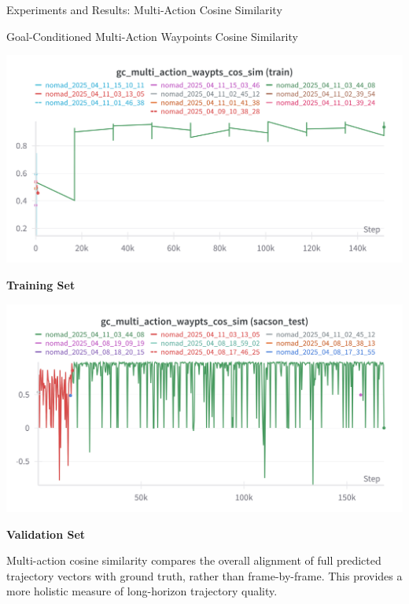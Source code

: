 \documentclass{beamer}
\begin{document}
\begin{frame}{Experiments and Results: Multi-Action Cosine Similarity}
    \begin{block}{Goal-Conditioned Multi-Action Waypoints Cosine Similarity}
        \begin{minipage}{0.48\textwidth}
            \centering
            \includegraphics[width=\textwidth]{images/multi_action_sim_train.png}
            
            
            \textbf{Training Set}
        \end{minipage}
        \hfill
        \begin{minipage}{0.48\textwidth}
            \centering
            \includegraphics[width=\textwidth]{images/multi_action_sim.png}
        
            
            \textbf{Validation Set}
        \end{minipage}
        
        \vspace{0.5em}
        \bigskip
        Multi-action cosine similarity compares the overall alignment of full predicted trajectory vectors with ground truth, rather than frame-by-frame. This provides a more holistic measure of long-horizon trajectory quality.
    \end{block}
\end{frame}
\end{document}
